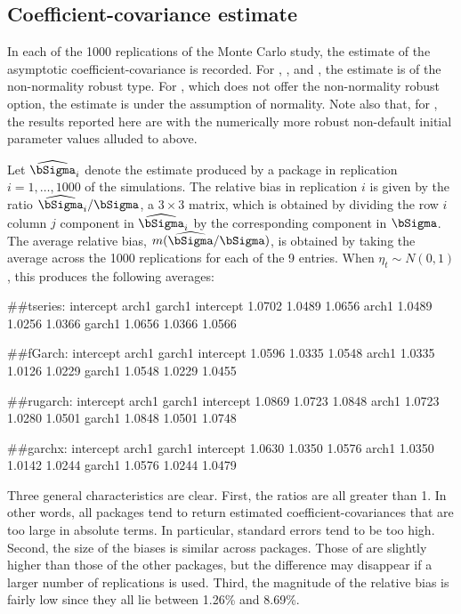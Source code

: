 \subsection{Coefficient-covariance estimate}

In each of the 1000 replications of the Monte Carlo study, the estimate of the asymptotic coefficient-covariance is recorded. For , , and , the estimate is of the non-normality robust type. For , which does not offer the non-normality robust option, the estimate is under the assumption of normality. Note also that, for , the results reported here are with the numerically more robust non-default initial parameter values alluded to above.

Let $\widehat{\bSigma}_i$ denote the estimate produced by a package in replication $i=1, \ldots, 1000$ of the simulations. The relative bias in replication $i$ is given by the ratio $\widehat{\bSigma}_i/\bSigma$, a $3\times 3$ matrix, which is obtained by dividing the row $i$ column $j$ component in $\widehat{\bSigma}_i$ by the corresponding component in $\bSigma$. The average relative bias, $m(\widehat{\bSigma}/\bSigma)$, is obtained by taking the average across the 1000 replications for each of the 9 entries. When $\eta_t\sim N(0,1)$, this produces the following averages:
%
\begin{example}
	##tseries:
	          intercept  arch1 garch1
	intercept    1.0702 1.0489 1.0656
	arch1        1.0489 1.0256 1.0366
	garch1       1.0656 1.0366 1.0566

	##fGarch:
	          intercept  arch1 garch1
	intercept    1.0596 1.0335 1.0548
	arch1        1.0335 1.0126 1.0229
	garch1       1.0548 1.0229 1.0455

	##rugarch:
	          intercept  arch1 garch1
	intercept    1.0869 1.0723 1.0848
	arch1        1.0723 1.0280 1.0501
	garch1       1.0848 1.0501 1.0748
	
	##garchx:
	          intercept  arch1 garch1
	intercept    1.0630 1.0350 1.0576
	arch1        1.0350 1.0142 1.0244
	garch1       1.0576 1.0244 1.0479
\end{example}
%
Three general characteristics are clear. First, the ratios are all greater than 1. In other words, all packages tend to return estimated coefficient-covariances that are too large in absolute terms. In particular, standard errors tend to be too high. Second, the size of the biases is similar across packages. Those of  are slightly higher than those of the other packages, but the difference may disappear if a larger number of replications is used. Third, the magnitude of the relative bias is fairly low since they all lie between 1.26\% and 8.69\%.

